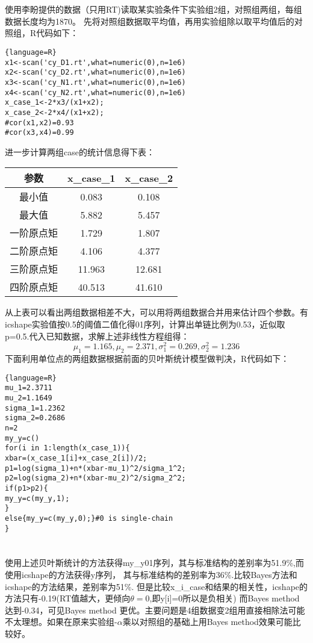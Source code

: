 \documentclass[12pt]{article}
\begin{document}
\section{\textbf{}}
使用李盼提供的数据（只用RT)读取某实验条件下实验组2组，对照组两组，每组数据长度均为1870。
先将对照组数据取平均值，再用实验组除以取平均值后的对照组，R代码如下：
\begin{lstlisting}{language=R}
x1<-scan('cy_D1.rt',what=numeric(0),n=1e6)
x2<-scan('cy_D2.rt',what=numeric(0),n=1e6)
x3<-scan('cy_N1.rt',what=numeric(0),n=1e6)
x4<-scan('cy_N2.rt',what=numeric(0),n=1e6)
x_case_1<-2*x3/(x1+x2);
x_case_2<-2*x4/(x1+x2);
#cor(x1,x2)=0.93
#cor(x3,x4)=0.99
\end{lstlisting}
进一步计算两组case的统计信息得下表：
\begin{table}[!ht]
\begin{tabular}{ccc}
\hline
参数 & x\_case\_1 & x\_case\_2 \\
\hline
最小值 & 0.083 & 0.108 \\
最大值 & 5.882 & 5.457 \\
一阶原点矩 &1.729 & 1.807 \\
二阶原点矩 &4.106 & 4.377\\
三阶原点矩 &11.963 &12.681\\
四阶原点矩 &40.513 &41.610\\
\hline
\end{tabular}
\end{table}
从上表可以看出两组数据相差不大，可以用将两组数据合并用来估计四个参数。有icshape实验值按0.5的阈值二值化得01序列，计算出单链比例为0.53，近似取p=0.5.代入已知数据，求解上述非线性方程组得：
\[\mu_1=1.165,\mu_2=2.371,\sigma_1^2=0.269,\sigma_2^2=1.236\]
下面利用单位点的两组数据根据前面的贝叶斯统计模型做判决，R代码如下：
\begin{lstlisting}{language=R}
mu_1=2.3711
mu_2=1.1649
sigma_1=1.2362
sigma_2=0.2686
n=2
my_y=c()
for(i in 1:length(x_case_1)){
xbar=(x_case_1[i]+x_case_2[i])/2;
p1=log(sigma_1)+n*(xbar-mu_1)^2/sigma_1^2;
p2=log(sigma_2)+n*(xbar-mu_2)^2/sigma_2^2;
if(p1>p2){
my_y=c(my_y,1);
}
else{my_y=c(my_y,0);}#0 is single-chain
}
\end{lstlisting}
\section{\textbf{}}
使用上述贝叶斯统计的方法获得my\_y01序列，其与标准结构的差别率为51.9\%,而使用icshape的方法获得y序列，
其与标准结构的差别率为36\%.比较Bayes方法和icshape的方法结果，差别率为51\%.
但是比较x\_i\_case和结果的相关性，icshape的方法只有-0.19(RT值越大，更倾向$\theta=0$,即y[i]=0所以是负相关)
而Bayes method 达到-0.34，可见Bayes method 更优。主要问题是4组数据变2组用直接相除法可能不太理想。如果在原来实验组-$\alpha$乘以对照组的基础上用Bayes method效果可能比较好。
\end{document}
